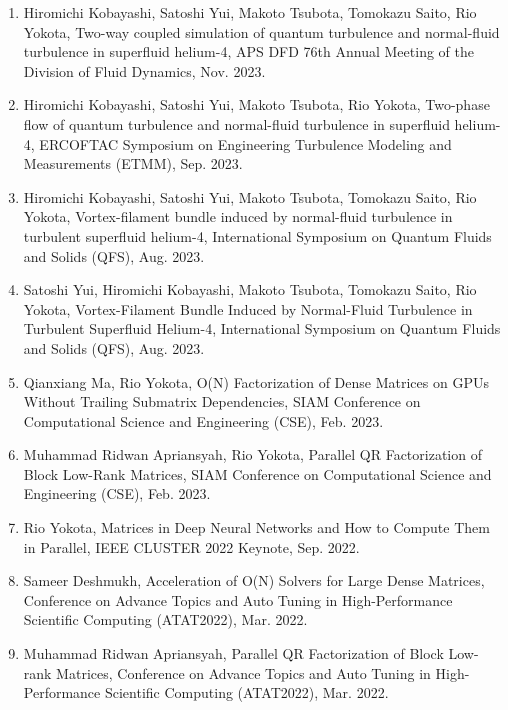 \documentclass[margin,line]{cv}
\begin{document}
\begin{resume}
\begin{enumerate}
\item Hiromichi Kobayashi, Satoshi Yui, Makoto Tsubota, Tomokazu Saito, Rio Yokota, Two-way coupled simulation of quantum turbulence and normal-fluid turbulence in superfluid helium-4, APS DFD 76th Annual Meeting of the Division of Fluid Dynamics, Nov. 2023.

\item Hiromichi Kobayashi, Satoshi Yui, Makoto Tsubota, Rio Yokota, Two-phase flow of quantum turbulence and normal-fluid turbulence in superfluid helium-4, ERCOFTAC Symposium on Engineering Turbulence Modeling and Measurements (ETMM), Sep. 2023.

\item Hiromichi Kobayashi, Satoshi Yui, Makoto Tsubota, Tomokazu Saito, Rio Yokota, Vortex-filament bundle induced by normal-fluid turbulence in turbulent superfluid helium-4, International Symposium on Quantum Fluids and Solids (QFS), Aug. 2023.

\item Satoshi Yui, Hiromichi Kobayashi, Makoto Tsubota, Tomokazu Saito, Rio Yokota, Vortex-Filament Bundle Induced by Normal-Fluid Turbulence in Turbulent Superfluid Helium-4, International Symposium on Quantum Fluids and Solids (QFS), Aug. 2023.

\item Qianxiang Ma, Rio Yokota, O(N) Factorization of Dense Matrices on GPUs Without Trailing Submatrix Dependencies, SIAM Conference on Computational Science and Engineering (CSE), Feb. 2023.

\item Muhammad Ridwan Apriansyah, Rio Yokota, Parallel QR Factorization of Block Low-Rank Matrices, SIAM Conference on Computational Science and Engineering (CSE), Feb. 2023.

\item Rio Yokota, Matrices in Deep Neural Networks and How to Compute Them in Parallel, IEEE CLUSTER 2022 Keynote, Sep. 2022.

\item Sameer Deshmukh, Acceleration of O(N) Solvers for Large Dense Matrices, Conference on Advance Topics and Auto Tuning in High-Performance Scientific Computing (ATAT2022), Mar. 2022.

\item Muhammad Ridwan Apriansyah, Parallel QR Factorization of Block Low-rank Matrices,  Conference on Advance Topics and Auto Tuning in High-Performance Scientific Computing (ATAT2022), Mar. 2022.


\end{enumerate}
\end{resume}
\end{document}
